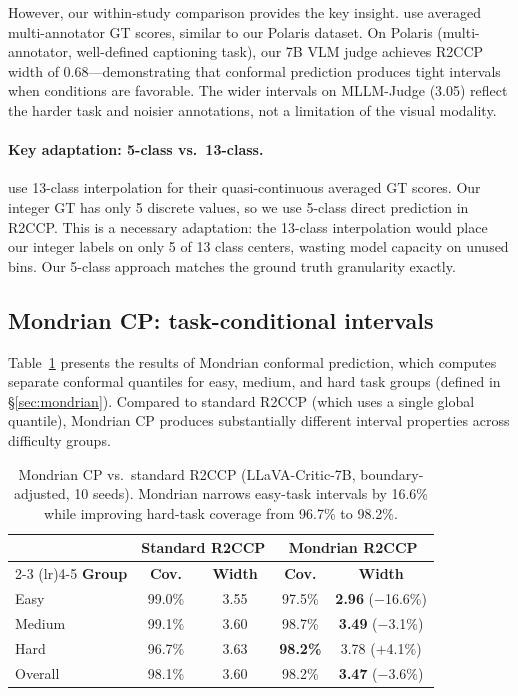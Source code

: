 \documentclass{article}
\begin{document}
However, our within-study comparison provides the key insight. \citet{sheng2025analyzing} use averaged multi-annotator GT scores, similar to our Polaris dataset. On Polaris (multi-annotator, well-defined captioning task), our 7B VLM judge achieves R2CCP width of 0.68---demonstrating that conformal prediction produces tight intervals when conditions are favorable. The wider intervals on MLLM-Judge (3.05) reflect the harder task and noisier annotations, not a limitation of the visual modality.

\paragraph{Key adaptation: 5-class vs.\ 13-class.} \citet{sheng2025analyzing} use 13-class interpolation for their quasi-continuous averaged GT scores. Our integer GT has only 5 discrete values, so we use 5-class direct prediction in R2CCP. This is a necessary adaptation: the 13-class interpolation would place our integer labels on only 5 of 13 class centers, wasting model capacity on unused bins. Our 5-class approach matches the ground truth granularity exactly.

\subsection{Mondrian CP: task-conditional intervals}
\label{sec:mondrian_results}

Table~\ref{tab:mondrian} presents the results of Mondrian conformal prediction, which computes separate conformal quantiles for easy, medium, and hard task groups (defined in \S\ref{sec:mondrian}). Compared to standard R2CCP (which uses a single global quantile), Mondrian CP produces substantially different interval properties across difficulty groups.

\begin{table}[t]
\centering
\caption{Mondrian CP vs.\ standard R2CCP (LLaVA-Critic-7B, boundary-adjusted, 10 seeds). Mondrian narrows easy-task intervals by 16.6\% while improving hard-task coverage from 96.7\% to 98.2\%.}
\label{tab:mondrian}
\small
\begin{tabular}{lcccc}
\toprule
& \multicolumn{2}{c}{\textbf{Standard R2CCP}} & \multicolumn{2}{c}{\textbf{Mondrian R2CCP}} \\
\cmidrule(lr){2-3} \cmidrule(lr){4-5}
\textbf{Group} & \textbf{Cov.} & \textbf{Width} & \textbf{Cov.} & \textbf{Width} \\
\midrule
Easy & 99.0\% & 3.55 & 97.5\% & \textbf{2.96} ($-$16.6\%) \\
Medium & 99.1\% & 3.60 & 98.7\% & \textbf{3.49} ($-$3.1\%) \\
Hard & 96.7\% & 3.63 & \textbf{98.2\%} & 3.78 ($+$4.1\%) \\
\midrule
Overall & 98.1\% & 3.60 & 98.2\% & \textbf{3.47} ($-$3.6\%) \\
\bottomrule
\end{tabular}
\end{table}
\end{document}
